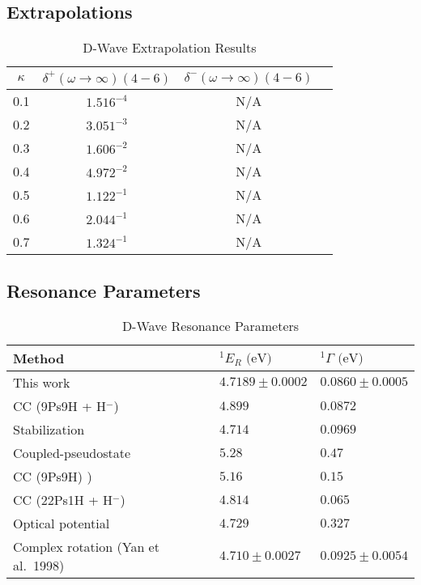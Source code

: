 \documentclass[Dissertation.tex]{subfiles}
\begin{document}
\subsection{Extrapolations}


\begin{table}[H]
\centering
\begin{tabular}{c | c c c}
\toprule
$\kappa$ & $\delta^+ (\omega \rightarrow \infty) (4-6)$ & $\delta^- (\omega \rightarrow \infty) (4-6)$  \\
\midrule
0.1 & $1.516^{-4}$ & N/A \\
0.2 & $3.051^{-3}$ & N/A \\
0.3 & $1.606^{-2}$ & N/A \\
0.4 & $4.972^{-2}$ & N/A \\
0.5 & $1.122^{-1}$ & N/A \\
0.6 & $2.044^{-1}$ & N/A \\
0.7 & $1.324^{-1}$ & N/A \\
\bottomrule
\end{tabular}
\caption{D-Wave Extrapolation Results}
\label{tab:DWaveExtrap}
\end{table}



\subsection{Resonance Parameters}

\setlength{\abovecaptionskip}{6pt}   %
\setlength{\belowcaptionskip}{6pt}   %
\begin{table}[H]
\centering
\begin{tabular}{l l l}
\toprule
Method & $^1E_R \text{ (eV)}$ & $^1\Gamma \text{ (eV)}$ \\
\midrule
This work & $4.7189 \pm 0.0002$ & $0.0860 \pm 0.0005$ \\
CC (9Ps9H + H$^-$) \cite{Walters2004} & $4.899$ & $0.0872$ \\
Stabilization \cite{Yan2003} & $4.714$ & $0.0969$ \\
Coupled-pseudostate \cite{Campbell1998} & $5.28$ & $0.47$ \\
CC (9Ps9H) \cite{Blackwood2002}) & $5.16$ & $0.15$ \\
CC (22Ps1H + H$^-$) \cite{Blackwood2002b} & $4.814$ & $0.065$ \\
Optical potential \cite{DiRienzi2002a} & $4.729$ & $0.327$ \\
Complex rotation (Yan et al.\ 1998) \cite{Ho1998} & $4.710 \pm 0.0027$ & $0.0925 \pm 0.0054$  \\
\bottomrule
\end{tabular}
\caption{D-Wave Resonance Parameters}
\label{tab:DWaveResonancesOther}
\end{table}



\biblio
\end{document}
